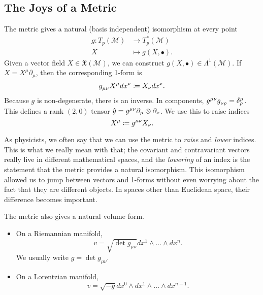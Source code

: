 \subsection{The Joys of a Metric}%
\label{sub:the_joys_of_a_metric}

The metric gives a natural (basis independent) isomorphism at every point
\begin{equation}
  \begin{split}
    g \colon T_p(\mathcal{M}) &\to T^*_{p}(\mathcal{M}) \\
    X &\mapsto g(X, \bullet).
  \end{split}
\end{equation}
Given a vector field $X \in \mathfrak{X}(\mathcal{M})$, we can construct $g(X, \bullet) \in \Lambda^1(\mathcal{M})$.
If $X = X^\mu \partial_\mu$, then the corresponding 1-form is
\begin{equation}
  g \indices{_\mu_\nu} X^\mu dx^\nu \coloneqq X_\nu dx^\nu.
\end{equation}
Because $g$ is non-degenerate, there is an inverse. In components, $g^{\mu\nu} g \indices{_\nu_\rho} = \delta^\mu_\rho$.
This defines a rank $(2, 0)$ tensor $\hat g = g \indices{^\mu^\nu} \partial_\mu \otimes \partial_\nu$. We use this to raise indices
\begin{equation}
  X^\mu \coloneqq g \indices{^\mu^\nu} X_\nu.
\end{equation}
\begin{leftbar}
  \begin{remark}
    As physicists, we often say that we can use the metric to \emph{raise} and \emph{lower} indices.
    This is what we really mean with that; the covariant and contravariant vectors really live in different mathematical spaces, and the \emph{lowering} of an index is the statement that the metric provides a natural isomorphism.
    This isomorphism allowed us to jump between vectors and 1-forms without even worrying about the fact that they are different objects. In spaces other than Euclidean space, their difference becomes important.
  \end{remark}
\end{leftbar}

The metric also gives a natural volume form. 
\begin{itemize}
  \item On a Riemannian manifold, 
  \begin{equation}
    v = \sqrt{\det g_{\mu\nu}} dx^1 \wedge \dots \wedge dx^n.
  \end{equation}
  We usually write $g = \det g_{\mu\nu}$.
  \item On a Lorentzian manifold, 
    \begin{equation}
      v = \sqrt{-g} dx^0 \wedge dx^1 \wedge \dots \wedge dx^{n-1}.
    \end{equation}
\end{itemize}

